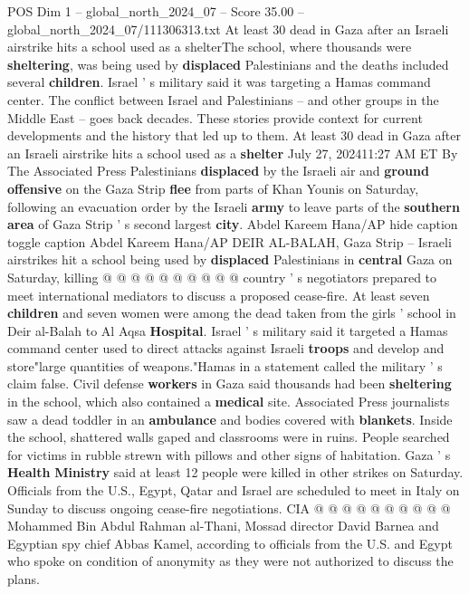 \begin{textsample}{POS Dim 1 – global\_north\_2024\_07 – Score 35.00 – global\_north\_2024\_07/111306313.txt}  \label{ex:f1_pos_383}
At least 30 dead in Gaza after an Israeli airstrike hits a school used as a shelterThe school, where thousands were \textbf{sheltering}, was being used by \textbf{displaced} Palestinians and the deaths included several \textbf{children}.
Israel ' s military said it was targeting a Hamas command center.
The conflict between Israel and Palestinians -- and other groups in the Middle East -- goes back decades.
These stories provide context for current developments and the history that led up to them.
At least 30 dead in Gaza after an Israeli airstrike hits a school used as a \textbf{shelter} July 27, 202411:27 AM ET By The Associated Press Palestinians \textbf{displaced} by the Israeli air and \textbf{ground} \textbf{offensive} on the Gaza Strip \textbf{flee} from parts of Khan Younis on Saturday, following an evacuation order by the Israeli \textbf{army} to leave parts of the \textbf{southern} \textbf{area} of Gaza Strip ' s second largest \textbf{city}.
Abdel Kareem Hana/AP hide caption toggle caption Abdel Kareem Hana/AP DEIR AL-BALAH, Gaza Strip -- Israeli airstrikes hit a school being used by \textbf{displaced} Palestinians in \textbf{central} Gaza on Saturday, killing @ @ @ @ @ @ @ @ @ @ country ' s negotiators prepared to meet international mediators to discuss a proposed cease-fire.
At least seven \textbf{children} and seven women were among the dead taken from the girls ' school in Deir al-Balah to Al Aqsa \textbf{Hospital}.
Israel ' s military said it targeted a Hamas command center used to direct attacks against Israeli \textbf{troops} and develop and store"large quantities of weapons."Hamas in a statement called the military ' s claim false.
Civil defense \textbf{workers} in Gaza said thousands had been \textbf{sheltering} in the school, which also contained a \textbf{medical} site.
Associated Press journalists saw a dead toddler in an \textbf{ambulance} and bodies covered with \textbf{blankets}.
Inside the school, shattered walls gaped and classrooms were in ruins.
People searched for victims in rubble strewn with pillows and other signs of habitation.
Gaza ' s \textbf{Health} \textbf{Ministry} said at least 12 people were killed in other strikes on Saturday.
Officials from the U.S., Egypt, Qatar and Israel are scheduled to meet in Italy on Sunday to discuss ongoing cease-fire negotiations.
CIA @ @ @ @ @ @ @ @ @ @ Mohammed Bin Abdul Rahman al-Thani, Mossad director David Barnea and Egyptian spy chief Abbas Kamel, according to officials from the U.S. and Egypt who spoke on condition of anonymity as they were not authorized to discuss the plans.

\end{textsample}
